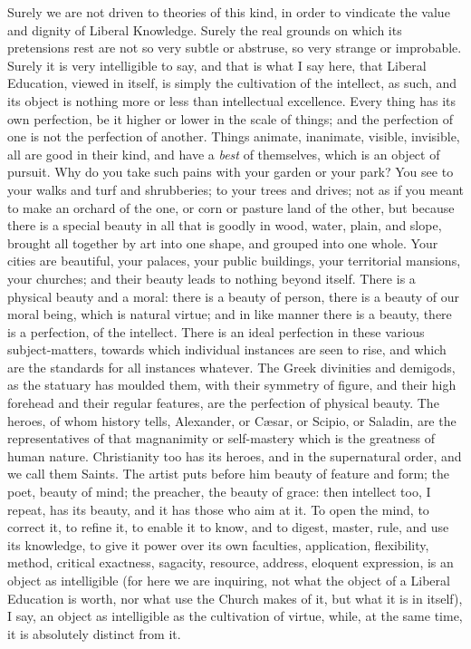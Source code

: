 Surely we are not driven to theories of this kind, in order to
vindicate the value and dignity of Liberal Knowledge. Surely the real
grounds on which its pretensions rest are not so very subtle or
abstruse, so very strange or improbable. Surely it is very
intelligible to say, and that is what I say here, that Liberal
Education, viewed in itself, is simply the cultivation of the
intellect, as such, and its object is nothing more or less than
intellectual excellence. Every thing has its own perfection, be it
higher or lower in the scale of things; and the perfection of one is
not the perfection of another. Things animate, inanimate, visible,
invisible, all are good in their kind, and have a \emph{best} of
themselves, which is an object of pursuit. Why do you take such pains
with your garden or your park? You see to your walks and turf
and shrubberies; to your trees and drives; not as if you meant to make
an orchard of the one, or corn or pasture land of the other, but
because there is a special beauty in all that is goodly in wood,
water, plain, and slope, brought all together by art into one shape,
and grouped into one whole. Your cities are beautiful, your palaces,
your public buildings, your territorial mansions, your churches; and
their beauty leads to nothing beyond itself. There is a physical
beauty and a moral: there is a beauty of person, there is a beauty of
our moral being, which is natural virtue; and in like manner there is
a beauty, there is a perfection, of the intellect. There is an ideal
perfection in these various subject-matters, towards which individual
instances are seen to rise, and which are the standards for all
instances whatever. The Greek divinities and demigods, as the statuary
has moulded them, with their symmetry of figure, and their high
forehead and their regular features, are the perfection of physical
beauty. The heroes, of whom history tells, Alexander, or Cæsar, or
Scipio, or Saladin, are the representatives of that magnanimity or
self-mastery which is the greatness of human nature. Christianity too
has its heroes, and in the supernatural order, and we call them
Saints. The artist puts before him beauty of feature and form; the
poet, beauty of mind; the preacher, the beauty of grace: then
intellect too, I repeat, has its beauty, and it has those who aim at
it. To open the mind, to correct it, to refine it, to enable it to
know, and to digest, master, rule, and use its knowledge, to give it
power over its own faculties, application, flexibility, method,
critical exactness, sagacity, resource, address, eloquent expression,
is an object as intelligible (for here we are inquiring, not what the
object of a Liberal Education is worth, nor what use the Church
makes of it, but what it is in itself), I say, an object as
intelligible as the cultivation of virtue, while, at the same time, it
is absolutely distinct from it.

